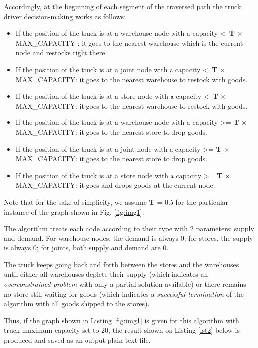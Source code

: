 \documentclass[journal,onecolumn]{IEEEtran}
\begin{document}
Accordingly, at the beginning of each segment of the traversed path the truck driver decision-making works as follows:
\begin{itemize}
    \item{If the position of the truck is at a warehouse node with a capacity \textless  \ \textbf{T} $ \times $ MAX\_CAPACITY : it goes to the nearest warehouse which is the current node and restocks right there.}
    \item{If the position of the truck is at a joint node with a capacity \textless \ \textbf{T} $ \times $ MAX\_CAPACITY: it goes to the nearest warehouse to restock with goods.}
    \item{If the position of the truck  is at a store node with a capacity \textless  \ \textbf{T} $ \times $ MAX\_CAPACITY: it goes to the nearest warehouse to restock with goods.}
   \item{If the position of the truck is at a warehouse node with a capacity \textgreater= \textbf{T} $ \times $ MAX\_CAPACITY: it goes to the nearest store to drop goods.}
   \item{If the position of the truck is at a joint node with a capacity \textgreater= \textbf{T} $ \times $ MAX\_CAPACITY: it goes to the nearest store to drop goods.}
   \item{If the position of the truck is at a store node with a capacity \textgreater= \textbf{T} $ \times $ MAX\_CAPACITY: it goes and drops goods at the current node.}  
\end{itemize}

Note that for the sake of simplicity, we assume \textbf{T} = 0.5 for the particular instance of the graph shown in Fig. \ref{fig:img1}.

The algorithm treats each node according to their type with 2 parameters: supply and demand. For warehouse nodes, the demand is always 0; for stores, the supply is always 0; for joints, both supply and demand are 0. 

The truck keeps going back and forth between the stores and the warehouses until either all warehouses deplete their supply (which indicates an \textit{overconstrained problem} with only a partial solution available) or there remains no store still waiting for goods (which indicates a \textit{successful termination} of the algorithm with all goods shipped to the stores).

Thus, if the graph shown in Listing \ref{fig:img1} is given for this algorithm with truck maximum capacity set to 20, the result shown on Listing \ref{lst2} below is produced and saved as an output plain text file.
\end{document}

